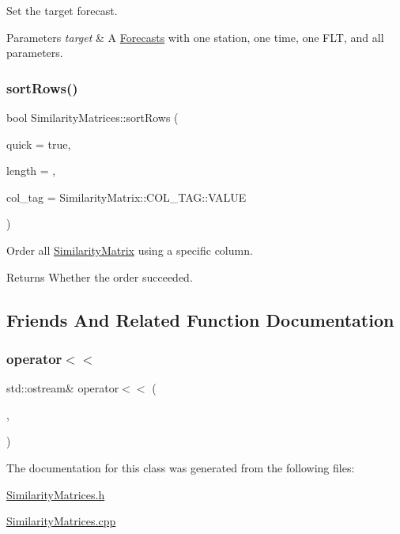 Set the target forecast.


\begin{DoxyParams}{Parameters}
{\em target} & A \mbox{\hyperlink{class_forecasts}{Forecasts}} with one station, one time, one F\+LT, and all parameters. \\
\hline
\end{DoxyParams}
\mbox{\label{class_similarity_matrices_a354f7292eee8b3977c223fae7667e6a9}} 
\subsubsection{\texorpdfstring{sort\+Rows()}{sortRows()}}
{\footnotesize\ttfamily bool Similarity\+Matrices\+::sort\+Rows (\begin{DoxyParamCaption}\item[{bool}]{quick = {\ttfamily true},  }\item[{size\+\_\+t}]{length = {},  }\item[{\mbox{\hyperlink{class_similarity_matrix_a79098014d74c2cf85f0dd8ad7fc4ac4f}{Similarity\+Matrix\+::\+C\+O\+L\+\_\+\+T\+AG}}}]{col\+\_\+tag = {\ttfamily SimilarityMatrix\+:\+:COL\+\_\+TAG\+:\+:VALUE} }\end{DoxyParamCaption})}

Order all \mbox{\hyperlink{class_similarity_matrix}{Similarity\+Matrix}} using a specific column.

\begin{DoxyReturn}{Returns}
Whether the order succeeded. 
\end{DoxyReturn}


\subsection{Friends And Related Function Documentation}
\mbox{\label{class_similarity_matrices_af149863a23588d5fe79dacef6d1a5edd}} 
\subsubsection{\texorpdfstring{operator$<$$<$}{operator<<}}
{\footnotesize\ttfamily std\+::ostream\& operator$<$$<$ (\begin{DoxyParamCaption}\item[{std\+::ostream \&}]{,  }\item[{const \mbox{\hyperlink{class_similarity_matrices}{Similarity\+Matrices}} \&}]{ }\end{DoxyParamCaption})\hspace{0.3cm}{\ttfamily [friend]}}



The documentation for this class was generated from the following files\+:\begin{DoxyCompactItemize}
\item 
\mbox{\hyperlink{_similarity_matrices_8h}{Similarity\+Matrices.\+h}}\item 
\mbox{\hyperlink{_similarity_matrices_8cpp}{Similarity\+Matrices.\+cpp}}\end{DoxyCompactItemize}
